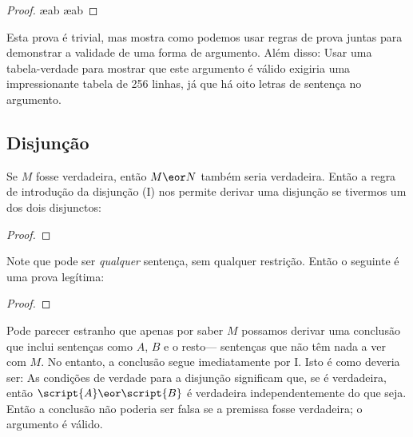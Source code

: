 \begin{proof}

	 \ae{ab}
	 \ae{ab}
	 
\end{proof}

Esta prova é trivial, mas mostra como podemos usar regras de prova juntas para demonstrar a validade de uma forma de argumento. Além disso: Usar uma tabela-verdade para mostrar que este argumento é válido exigiria uma impressionante tabela de 256 linhas, já que há oito letras de sentença no argumento.



\subsection{Disjunção}
Se $M$ fosse verdadeira, então $M \eor N$ também seria verdadeira. Então a regra de introdução da disjunção ({\eor}I) nos permite derivar uma disjunção se tivermos um dos dois disjunctos:

\begin{proof}
\end{proof}

Note que  pode ser \emph{qualquer} sentença, sem qualquer restrição. Então o seguinte é uma prova legítima:

\begin{proof}
\end{proof}

Pode parecer estranho que apenas por saber $M$ possamos derivar uma conclusão que inclui sentenças como $A$, $B$ e o resto--- sentenças que não têm nada a ver com $M$. No entanto, a conclusão segue imediatamente por {\eor}I. Isto é como deveria ser: As condições de verdade para a disjunção significam que, se  é verdadeira, então $\script{A}\eor \script{B}$ é verdadeira independentemente do que  seja. Então a conclusão não poderia ser falsa se a premissa fosse verdadeira; o argumento é válido.

